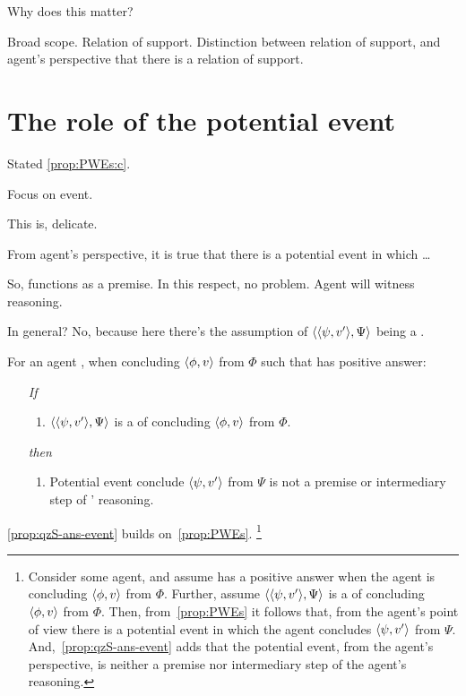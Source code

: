 \begin{note}
  Why does this matter?

  Broad scope.
  Relation of support.
  Distinction between relation of support, and agent's perspective that there is a relation of support.
\end{note}

\section{The role of the potential event}
\label{sec:no-premise}

\begin{note}
  Stated \ref{prop:PWEs:c}.

  Focus on event.

  This is, delicate.

  From agent's perspective, it is true that there is a potential event in which \dots

  So, functions as a premise.
  In this respect, no problem.
  Agent will witness reasoning.
\end{note}

\begin{note}
  In general?
  No, because here there's the assumption of \(\langle \langle \psi, v' \rangle, \Psi \rangle\) being a \requ{}.

  \begin{proposition}
    \label{prop:qzS-ans-event}
    For an agent \vAgent{}, when concluding \(\langle \phi, v \rangle\) from \(\Phi\) such that \qzS{} has positive answer:
    \begin{enumerate}
    \item[\emph{If}]
      \begin{enumerate}[label=\alph*., ref=(\alph*)]
      \item \(\langle \langle \psi, v' \rangle, \Psi \rangle\) is a \requ{} of concluding \(\langle \phi, v \rangle\) from \(\Phi\).
      \end{enumerate}
    \item[\emph{then}]
      \begin{enumerate}[label=\alph*., ref=(\alph*), resume]
      \item
        Potential event conclude \(\langle \psi, v' \rangle\) from \(\Psi\) is not a premise or intermediary step of \vAgent{}' reasoning.
      \end{enumerate}
    \end{enumerate}
  \end{proposition}

  \autoref{prop:qzS-ans-event} builds on~\autoref{prop:PWEs}.%
  \footnote{
    Consider some agent, and assume \qzS{} has a positive answer when the agent is concluding \(\langle \phi, v \rangle\) from \(\Phi\).
    Further, assume \(\langle \langle \psi, v' \rangle, \Psi \rangle\) is a \requ{} of concluding \(\langle \phi, v \rangle\) from \(\Phi\).
    Then, from~\autoref{prop:PWEs} it follows that, from the agent's point of view there is a potential event in which the agent concludes \(\langle \psi, v' \rangle\) from \(\Psi\).
    And,~\autoref{prop:qzS-ans-event} adds that the potential event, from the agent's perspective, is neither a premise nor intermediary step of the agent's reasoning.
  }
\end{note}

